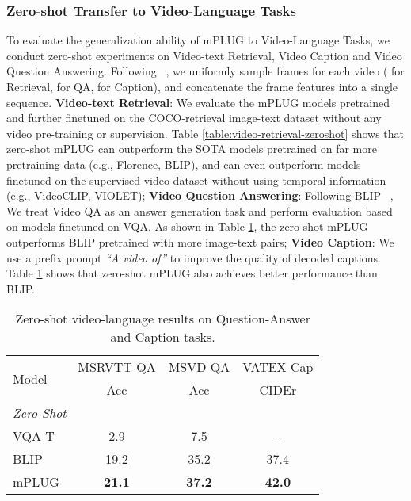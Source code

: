 \documentclass[11pt]{article}
\newcommand{\modelname}{mPLUG }
\begin{document}
\subsubsection{Zero-shot Transfer to Video-Language Tasks}
To evaluate the generalization ability of \modelname to Video-Language Tasks, we conduct zero-shot experiments on Video-text Retrieval, Video Caption and Video Question Answering. Following ~\cite{li2022blip}, we uniformly sample  frames for each video ( for Retrieval,  for  QA,  for Caption), and concatenate the frame features into a single sequence. \textbf{Video-text Retrieval}: We evaluate the \modelname models pretrained and further finetuned on the COCO-retrieval image-text dataset without any video pre-training or supervision. Table \ref{table:video-retrieval-zeroshot} shows that zero-shot \modelname can outperform the SOTA models pretrained on far more pretraining data (e.g., Florence, BLIP), and can even outperform models finetuned on the supervised video dataset without using temporal information (e.g., VideoCLIP, VIOLET); \textbf{Video Question Answering}: Following BLIP ~\cite{li2022blip}, We treat Video QA as an answer generation task and perform evaluation based on models finetuned on VQA. As shown in Table \ref{table:video-qa-zeroshot}, the zero-shot \modelname outperforms BLIP pretrained with more image-text pairs; \textbf{Video Caption}: We use a prefix prompt \emph{“A video of”} to improve the quality of decoded captions. Table \ref{table:video-qa-zeroshot} shows that zero-shot \modelname also achieves better performance than BLIP.

\begin{table}
\setlength\tabcolsep{4pt}
\small
\centering
\begin{tabular}{l|cc|c}
\toprule
\multicolumn{1}{l|}{\multirow{2}{*}{Model}}  &
MSRVTT-QA & MSVD-QA & VATEX-Cap \\
& Acc & Acc & CIDEr  \\
\midrule
\multicolumn{4}{l}{\emph{Zero-Shot}} \\
\midrule
VQA-T ~\cite{yang2021justask} &2.9&7.5&-\\
BLIP ~\cite{li2022blip} &19.2&35.2&37.4\\
mPLUG    &\textbf{21.1} &\textbf{37.2}& \textbf{42.0}\\
\bottomrule
\end{tabular} 
\caption{Zero-shot video-language results on Question-Answer and Caption tasks.}
\label{table:video-qa-zeroshot}
\end{table}
\end{document}
